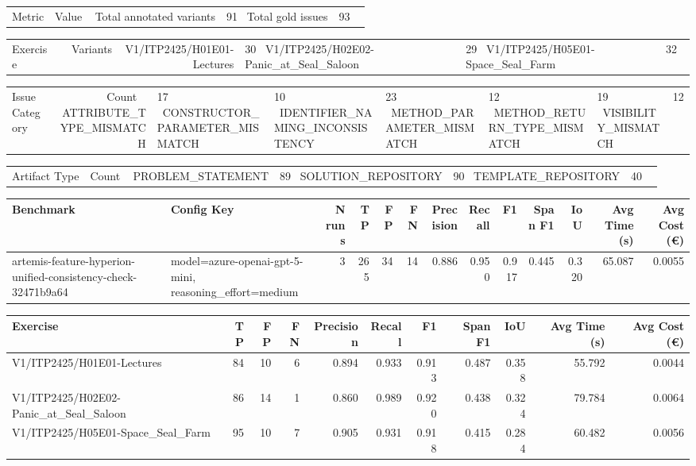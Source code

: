 \begin{tabular}{lr}
Metric & Value \
\hline
Total annotated variants & 91 \
Total gold issues & 93 \
\end{tabular}

\begin{tabular}{lr}
Exercise & Variants \
\hline
V1/ITP2425/H01E01-Lectures & 30 \
V1/ITP2425/H02E02-Panic\_at\_Seal\_Saloon & 29 \
V1/ITP2425/H05E01-Space\_Seal\_Farm & 32 \
\end{tabular}

\begin{tabular}{lr}
Issue Category & Count \
\hline
ATTRIBUTE\_TYPE\_MISMATCH & 17 \
CONSTRUCTOR\_PARAMETER\_MISMATCH & 10 \
IDENTIFIER\_NAMING\_INCONSISTENCY & 23 \
METHOD\_PARAMETER\_MISMATCH & 12 \
METHOD\_RETURN\_TYPE\_MISMATCH & 19 \
VISIBILITY\_MISMATCH & 12 \
\end{tabular}

\begin{tabular}{lr}
Artifact Type & Count \
\hline
PROBLEM\_STATEMENT & 89 \
SOLUTION\_REPOSITORY & 90 \
TEMPLATE\_REPOSITORY & 40 \
\end{tabular}

\begin{tabular}{llrrrrrrrrrrr}
Benchmark & Config Key & N runs & TP & FP & FN & Precision & Recall & F1 & Span F1 & IoU & Avg Time (s) & Avg Cost (€) \\
\hline
artemis-feature-hyperion-unified-consistency-check-32471b9a64 & model=azure-openai-gpt-5-mini, reasoning\_effort=medium & 3 & 265 & 34 & 14 & 0.886 & 0.950 & 0.917 & 0.445 & 0.320 & 65.087 & 0.0055 \\
\end{tabular}

\begin{tabular}{lrrrrrrrrrr}
Exercise & TP & FP & FN & Precision & Recall & F1 & Span F1 & IoU & Avg Time (s) & Avg Cost (€) \\
\hline
V1/ITP2425/H01E01-Lectures & 84 & 10 & 6 & 0.894 & 0.933 & 0.913 & 0.487 & 0.358 & 55.792 & 0.0044 \\
V1/ITP2425/H02E02-Panic\_at\_Seal\_Saloon & 86 & 14 & 1 & 0.860 & 0.989 & 0.920 & 0.438 & 0.324 & 79.784 & 0.0064 \\
V1/ITP2425/H05E01-Space\_Seal\_Farm & 95 & 10 & 7 & 0.905 & 0.931 & 0.918 & 0.415 & 0.284 & 60.482 & 0.0056 \\
\end{tabular}

